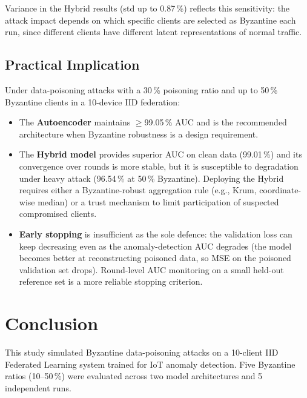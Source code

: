 \documentclass[11pt,a4paper]{article}
\begin{document}
Variance in the Hybrid results (std up to 0.87\,\%) reflects this sensitivity:
the attack impact depends on which specific clients are selected as Byzantine each run,
since different clients have different latent representations of normal traffic.

\subsection{Practical Implication}

Under data-poisoning attacks with a 30\,\% poisoning ratio and up to 50\,\% Byzantine
clients in a 10-device IID federation:

\begin{itemize}[leftmargin=1.5em]
  \item The \textbf{Autoencoder} maintains $\geq$99.05\,\% AUC and is the recommended
        architecture when Byzantine robustness is a design requirement.
  \item The \textbf{Hybrid model} provides superior AUC on clean data (99.01\,\%) and
        its convergence over rounds is more stable, but it is susceptible to degradation
        under heavy attack (96.54\,\% at 50\,\% Byzantine).
        Deploying the Hybrid requires either a Byzantine-robust aggregation rule (e.g.,
        Krum, coordinate-wise median) or a trust mechanism to limit participation of
        suspected compromised clients.
  \item \textbf{Early stopping} is insufficient as the sole defence: the validation loss
        can keep decreasing even as the anomaly-detection AUC degrades (the model becomes
        better at reconstructing poisoned data, so MSE on the poisoned validation set
        drops).
        Round-level AUC monitoring on a small held-out reference set is a more reliable
        stopping criterion.
\end{itemize}

\section{Conclusion}

This study simulated Byzantine data-poisoning attacks on a 10-client IID Federated
Learning system trained for IoT anomaly detection.
Five Byzantine ratios (10--50\,\%) were evaluated across two model architectures
and 5 independent runs.
\end{document}
